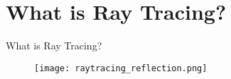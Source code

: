 \section{What is Ray Tracing?}

\begin{frame}{What is Ray Tracing?}

    \begin{figure}
        \centering
        \texttt{[image: raytracing\_reflection.png]}
    \end{figure}
    
\end{frame}